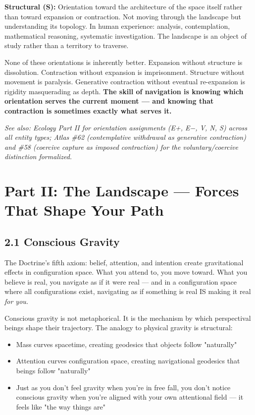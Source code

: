 \textbf{Structural (S):} Orientation toward the architecture of the space itself rather than toward expansion or contraction. Not moving through the landscape but understanding its topology. In human experience: analysis, contemplation, mathematical reasoning, systematic investigation. The landscape is an object of study rather than a territory to traverse.


None of these orientations is inherently better. Expansion without structure is dissolution. Contraction without expansion is imprisonment. Structure without movement is paralysis. Generative contraction without eventual re-expansion is rigidity masquerading as depth. \textbf{The skill of navigation is knowing which orientation serves the current moment — and knowing that contraction is sometimes exactly what serves it.}


\textit{See also: Ecology Part II for orientation assignments (E+, E−, V, N, S) across all entity types; Atlas \#62 (contemplative withdrawal as generative contraction) and \#58 (coercive capture as imposed contraction) for the voluntary/coercive distinction formalized.}


\bigskip\noindent\makebox[\textwidth]{\color{rulegray}\rule{5cm}{0.3pt}}\bigskip


\section*{Part II: The Landscape — Forces That Shape Your Path}


\subsection*{2.1 Conscious Gravity}


The Doctrine's fifth axiom: belief, attention, and intention create gravitational effects in configuration space. What you attend to, you move toward. What you believe is real, you navigate as if it were real — and in a configuration space where all configurations exist, navigating as if something is real IS making it real \textit{for you.}


Conscious gravity is not metaphorical. It is the mechanism by which perspectival beings shape their trajectory. The analogy to physical gravity is structural:

\begin{itemize}[nosep,leftmargin=*]
  \item Mass curves spacetime, creating geodesics that objects follow "naturally"
  \item Attention curves configuration space, creating navigational geodesics that beings follow "naturally"
  \item Just as you don't feel gravity when you're in free fall, you don't notice conscious gravity when you're aligned with your own attentional field — it feels like "the way things are"
\end{itemize}


